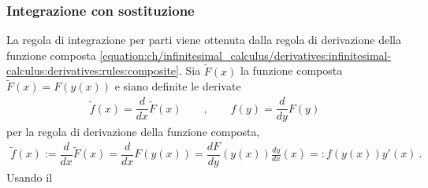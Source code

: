 \documentclass[letterpaper,10pt,italian]{jupyterBook}
\begin{document}
\subsubsection{Integrazione con sostituzione}
\label{\detokenize{ch/infinitesimal_calculus/integrals:integrazione-con-sostituzione}}\label{\detokenize{ch/infinitesimal_calculus/integrals:infinitesimal-calculus-integrals-substitution}}
\sphinxAtStartPar
La regola di integrazione per parti viene ottenuta dalla regola di derivazione della funzione composta \eqref{equation:ch/infinitesimal_calculus/derivatives:infinitesimal-calculus:derivatives:rules:composite}. Sia \(\widetilde{F}(x)\) la funzione composta \(\widetilde{F}(x) = F( y(x) )\) e siano definite le derivate
\begin{equation*}
\begin{split}\widetilde{f}(x) = \dfrac{d}{dx} \widetilde{F}(x)  \qquad , \qquad
             f (y) = \dfrac{d}{dy}            F (y)\end{split}
\end{equation*}
\sphinxAtStartPar
per la regola di derivazione della funzione composta,
\begin{equation*}
\begin{split}\widetilde{f}(x) := \dfrac{d}{dx} \widetilde{F}(x) = \dfrac{d}{dx} F(y(x)) = 
\dfrac{d F}{d y}(y(x)) \frac{d y}{d x}(x) =: f(y(x)) y'(x) \ .\end{split}
\end{equation*}
\sphinxAtStartPar
Usando il {\hyperref[\detokenize{ch/infinitesimal_calculus/integrals:infinitesimal-calculus-integrals-thm-fund}]{}}

\sphinxAtStartPar
{}

\sphinxstepscope
\end{document}
